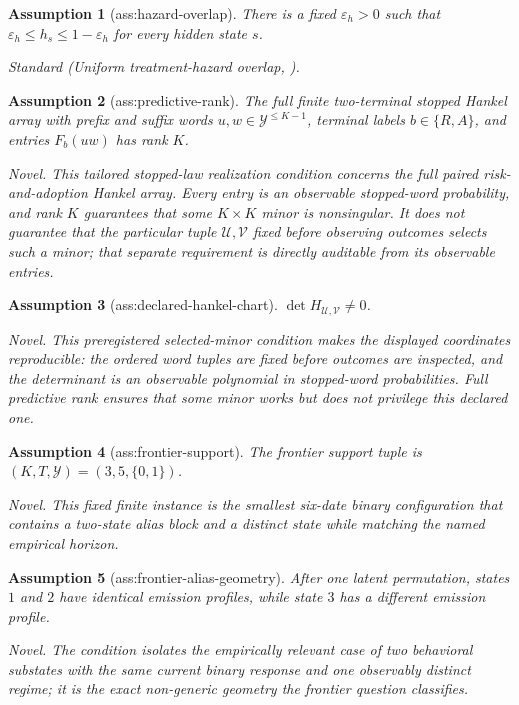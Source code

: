 \documentclass{article}
\newtheorem{assumption}{Assumption}
\begin{document}
\begin{assumption}[ass:hazard-overlap]\label{ass:hazard-overlap}
There is a fixed \(\varepsilon_h>0\) such that \(\varepsilon_h\le h_s\le1-\varepsilon_h\) for every hidden state \(s\).
\par\smallskip\noindent\emph{Standard} (Uniform treatment-hazard overlap, \cite{CallawaySantAnna2021DiD}).
\end{assumption}

\begin{assumption}[ass:predictive-rank]\label{ass:predictive-rank}
The full finite two-terminal stopped Hankel array with prefix and suffix words \(u,w\in\mathcal Y^{\le K-1}\), terminal labels \(b\in\{R,A\}\), and entries \(F_b(uw)\) has rank \(K\).
\par\smallskip\noindent\emph{Novel.} This tailored stopped-law realization condition concerns the full paired risk-and-adoption Hankel array. Every entry is an observable stopped-word probability, and rank \(K\) guarantees that some \(K\times K\) minor is nonsingular. It does not guarantee that the particular tuple \(\mathcal U,\mathcal V\) fixed before observing outcomes selects such a minor; that separate requirement is directly auditable from its observable entries.
\end{assumption}

\begin{assumption}[ass:declared-hankel-chart]\label{ass:declared-hankel-chart}
\(\det H_{\mathcal U,\mathcal V}\ne0\).
\par\smallskip\noindent\emph{Novel.} This preregistered selected-minor condition makes the displayed coordinates reproducible: the ordered word tuples are fixed before outcomes are inspected, and the determinant is an observable polynomial in stopped-word probabilities. Full predictive rank ensures that some minor works but does not privilege this declared one.
\end{assumption}

\begin{assumption}[ass:frontier-support]\label{ass:frontier-support}
The frontier support tuple is \((K,T,\mathcal Y)=(3,5,\{0,1\})\).
\par\smallskip\noindent\emph{Novel.} This fixed finite instance is the smallest six-date binary configuration that contains a two-state alias block and a distinct state while matching the named empirical horizon.
\end{assumption}

\begin{assumption}[ass:frontier-alias-geometry]\label{ass:frontier-alias-geometry}
After one latent permutation, states \(1\) and \(2\) have identical emission profiles, while state \(3\) has a different emission profile.
\par\smallskip\noindent\emph{Novel.} The condition isolates the empirically relevant case of two behavioral substates with the same current binary response and one observably distinct regime; it is the exact non-generic geometry the frontier question classifies.
\end{assumption}
\end{document}
